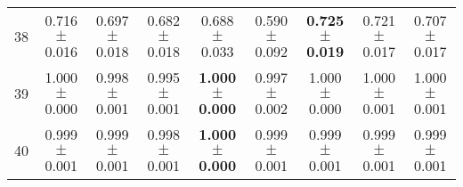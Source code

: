 \begin{table}[!ht]
{\begin{tabular}{r c c c c c c c c}
38 & 0.716 $\pm$ 0.016 & 0.697 $\pm$ 0.018 & 0.682 $\pm$ 0.018 & 0.688 $\pm$ 0.033 & 0.590 $\pm$ 0.092 & \textbf{0.725 $\pm$ 0.019} & 0.721 $\pm$ 0.017 & 0.707 $\pm$ 0.017 \\
39 & 1.000 $\pm$ 0.000 & 0.998 $\pm$ 0.001 & 0.995 $\pm$ 0.001 & \textbf{1.000 $\pm$ 0.000} & 0.997 $\pm$ 0.002 & 1.000 $\pm$ 0.000 & 1.000 $\pm$ 0.001 & 1.000 $\pm$ 0.001 \\
40 & 0.999 $\pm$ 0.001 & 0.999 $\pm$ 0.001 & 0.998 $\pm$ 0.001 & \textbf{1.000 $\pm$ 0.000} & 0.999 $\pm$ 0.001 & 0.999 $\pm$ 0.001 & 0.999 $\pm$ 0.001 & 0.999 $\pm$ 0.001 \\
\end{tabular}}
\end{table}
